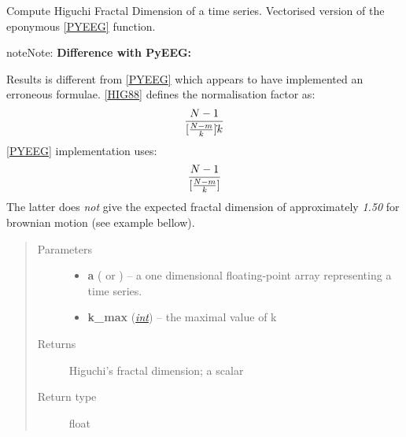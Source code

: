 \documentclass[letterpaper,10pt,english]{sphinxmanual}
\begin{document}
\begin{fulllineitems}
\label{pyrem.univariate:pyrem.univariate.hfd}
Compute Higuchi Fractal Dimension of a time series.
Vectorised version of the eponymous {\hyperref[pyrem.univariate:pyeeg]{{[}PYEEG{]}}} function.

\begin{notice}{note}{Note:}
\textbf{Difference with PyEEG:}

Results is different from {\hyperref[pyrem.univariate:pyeeg]{{[}PYEEG{]}}} which appears to have implemented an erroneous formulae.
{\hyperref[pyrem.univariate:hig88]{{[}HIG88{]}}} defines the normalisation factor as:
\begin{gather}
\begin{split}\frac{N-1}{[\frac{N-m}{k} ]\dot{} k}\end{split}\notag
\end{gather}
{\hyperref[pyrem.univariate:pyeeg]{{[}PYEEG{]}}} implementation uses:
\begin{gather}
\begin{split}\frac{N-1}{[\frac{N-m}{k}]}\end{split}\notag
\end{gather}
The latter does \emph{not} give the expected fractal dimension of approximately \emph{1.50} for brownian motion (see example bellow).
\end{notice}
\begin{quote}\begin{description}
\item[{Parameters}] \leavevmode\begin{itemize}
\item {} 
\textbf{a} (\href{http://docs.scipy.org/doc/numpy/reference/generated/numpy.ndarray.html\#numpy.ndarray}{} or {\hyperref[pyrem.time_series:pyrem.time_series.Signal]{}}) -- a one dimensional floating-point array representing a time series.

\item {} 
\textbf{k\_max} (\href{http://docs.python.org/2.7/library/functions.html\#int}{\emph{int}}) -- the maximal value of k

\end{itemize}

\item[{Returns}] \leavevmode
Higuchi's fractal dimension; a scalar

\item[{Return type}] \leavevmode
float


\end{description}
\end{quote}
\end{fulllineitems}
\end{document}
